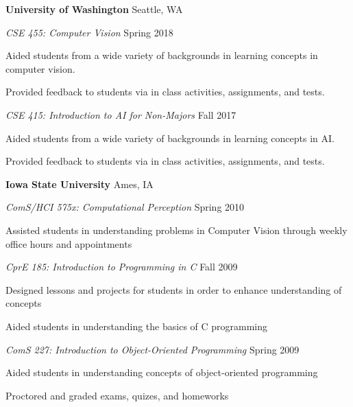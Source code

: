 \documentclass[10pt]{article}
\newcommand{\blankline}{\quad\pagebreak[3]}
\newcommand{\halfblankline}{\quad\vspace{-0.9\baselineskip}\pagebreak[3]}
\begin{document}
\textbf{University of Washington} \hfill Seattle, WA

\begin{outerlist}

\item[] \emph{CSE 455: Computer Vision} \hfill Spring 2018 
        \begin{innerlist}
	\item Aided students from a wide variety of backgrounds in learning concepts in computer vision.
	\item Provided feedback to students via in class activities, assignments, and tests.
        \end{innerlist}

\item[] \emph{CSE 415: Introduction to AI for Non-Majors} \hfill Fall 2017 
        \begin{innerlist}
	\item Aided students from a wide variety of backgrounds in learning concepts in AI.
	\item Provided feedback to students via in class activities, assignments, and tests.
        \end{innerlist}

\end{outerlist}

\blankline

\textbf{Iowa State University} \hfill Ames, IA

\begin{outerlist}

\item[] \emph{ComS/HCI 575x: Computational Perception} \hfill Spring 2010 
        \begin{innerlist}
	\item Assisted students in understanding problems in Computer Vision through weekly office 
 hours and appointments
        \end{innerlist}

\halfblankline

\item[] \emph{CprE 185: Introduction to Programming in C} \hfill Fall 2009 
        \begin{innerlist}
	\item Designed lessons and projects for students in order to enhance understanding of concepts
	\item Aided students in understanding the basics of C programming
        \end{innerlist}

\halfblankline

\item[] \emph{ComS 227: Introduction to Object-Oriented Programming} \hfill Spring 2009 
        \begin{innerlist}
	\item Aided students in understanding concepts of object-oriented programming
	\item Proctored and graded exams, quizes, and homeworks
        \end{innerlist}

\end{outerlist}
\end{document}
